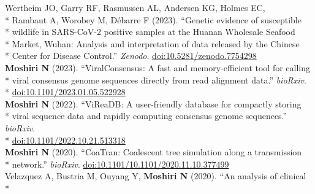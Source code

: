 \documentclass[margin,line]{res}
\begin{document}
\begin{resume}
\hspace*{9mm} Wertheim JO, Garry RF, Rasmussen AL, Andersen KG, Holmes EC,\\*
\hspace*{9mm} Rambaut A, Worobey M, D\'ebarre F (2023). ``Genetic evidence of susceptible\\*
\hspace*{9mm} wildlife in SARS-CoV-2 positive samples at the Huanan Wholesale Seafood\\*
\hspace*{9mm} Market, Wuhan: Analysis and interpretation of data released by the Chinese\\*\vspace{2mm}
\hspace*{8mm} Center for Disease Control.'' \textit{Zenodo}. \href{https://doi.org/10.5281/zenodo.7754298}{doi:10.5281/zenodo.7754298}\\
\hspace*{4mm} \textbf{Moshiri N} (2023). ``ViralConsensus: A fast and memory-efficient tool for calling\\*
\hspace*{9mm} viral consensus genome sequences directly from read alignment data.'' \textit{bioRxiv}.\\*\vspace{2mm}
\hspace*{8mm} \href{https://doi.org/10.1101/2023.01.05.522928}{doi:10.1101/2023.01.05.522928}\\
\hspace*{4mm} \textbf{Moshiri N} (2022). ``ViReaDB: A user-friendly database for compactly storing\\*
\hspace*{9mm} viral sequence data and rapidly computing consensus genome sequences.'' \textit{bioRxiv}.\\*\vspace{2mm}
\hspace*{8mm} \href{https://doi.org/10.1101/2022.10.21.513318}{doi:10.1101/2022.10.21.513318}\\
\hspace*{4mm} \textbf{Moshiri N} (2020). ``CoaTran: Coalescent tree simulation along a transmission\\*\vspace{2mm}
\hspace*{8mm} network.'' \textit{bioRxiv}. \href{https://doi.org/10.1101/10.1101/2020.11.10.377499}{doi:10.1101/10.1101/2020.11.10.377499}\\
\hspace*{4mm} Velazquez A, Bustria M, Ouyang Y, \textbf{Moshiri N} (2020). ``An analysis of clinical\\*

\end{resume}
\end{document}
